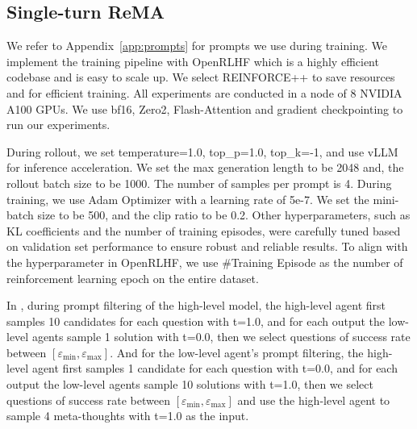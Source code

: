 \subsection{Single-turn ReMA}
\label{app:exp_setting.single_turn_rema}
We refer to Appendix~\ref{app:prompts} for prompts we use during training.
We implement the training pipeline with OpenRLHF \citep{hu2024openrlhf} which is a highly efficient codebase and is easy to scale up.
We select REINFORCE++ to save resources and for efficient training. All experiments are conducted in a node of 8 NVIDIA A100 GPUs. We use bf16, Zero2, Flash-Attention and gradient checkpointing to run our experiments.

During rollout, we set temperature=1.0, top\_p=1.0, top\_k=-1, and use vLLM for inference acceleration. We set the max generation length to be 2048 and, the rollout batch size to be 1000. The number of samples per prompt is 4. During training, we use Adam Optimizer with a learning rate of 5e-7. We set the mini-batch size to be 500, and the clip ratio to be 0.2. 
Other hyperparameters, such as KL coefficients and the number of training episodes, were carefully tuned based on validation set performance to ensure robust and reliable results. To align with the hyperparameter in OpenRLHF, we use \#Training Episode as the number of reinforcement learning epoch on the entire dataset.

In \method, during prompt filtering of the high-level model, the high-level agent first samples 10 candidates for each question with t=1.0, and for each output the low-level agents sample 1 solution with t=0.0, then we select questions of success rate between $[\varepsilon_{\min}, \varepsilon_{\max}]$. And for the low-level agent's prompt filtering, the high-level agent first samples 1 candidate for each question with t=0.0, and for each output the low-level agents sample 10 solutions with t=1.0, then we select questions of success rate between $[\varepsilon_{\min}, \varepsilon_{\max}]$ and use the high-level agent to sample 4 meta-thoughts with t=1.0 as the input.
